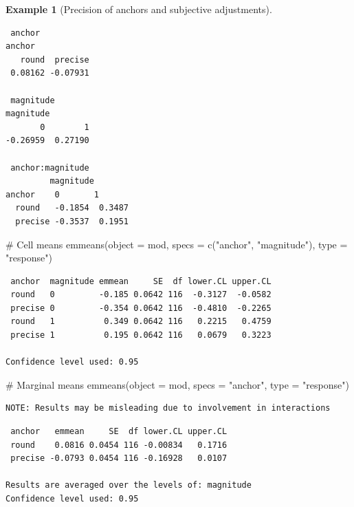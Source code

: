 \documentclass[
  11pt,
  letterpaper,
]{scrbook}
\newenvironment{Shaded}{\begin{snugshade}}{\end{snugshade}}
\newcommand{\AttributeTok}[1]{\textcolor[rgb]{0.40,0.45,0.13}{#1}}
\newcommand{\CommentTok}[1]{\textcolor[rgb]{0.37,0.37,0.37}{#1}}
\newcommand{\FunctionTok}[1]{\textcolor[rgb]{0.28,0.35,0.67}{#1}}
\newcommand{\NormalTok}[1]{\textcolor[rgb]{0.00,0.23,0.31}{#1}}
\newcommand{\StringTok}[1]{\textcolor[rgb]{0.13,0.47,0.30}{#1}}
\theoremstyle{definition}
\newtheorem{example}{Example}[chapter]
\theoremstyle{definition}
\theoremstyle{remark}
\begin{document}
\begin{example}[Precision of anchors and subjective
adjustments]
\begin{verbatim}
 anchor 
anchor
   round  precise 
 0.08162 -0.07931 

 magnitude 
magnitude
       0        1 
-0.26959  0.27190 

 anchor:magnitude 
         magnitude
anchor    0       1      
  round   -0.1854  0.3487
  precise -0.3537  0.1951
\end{verbatim}

\begin{Shaded}
\begin{Highlighting}[]
\CommentTok{\# Cell means}
\FunctionTok{emmeans}\NormalTok{(}\AttributeTok{object =}\NormalTok{ mod, }
        \AttributeTok{specs =} \FunctionTok{c}\NormalTok{(}\StringTok{"anchor"}\NormalTok{, }\StringTok{"magnitude"}\NormalTok{),}
        \AttributeTok{type =} \StringTok{"response"}\NormalTok{)}
\end{Highlighting}
\end{Shaded}

\begin{verbatim}
 anchor  magnitude emmean     SE  df lower.CL upper.CL
 round   0         -0.185 0.0642 116  -0.3127  -0.0582
 precise 0         -0.354 0.0642 116  -0.4810  -0.2265
 round   1          0.349 0.0642 116   0.2215   0.4759
 precise 1          0.195 0.0642 116   0.0679   0.3223

Confidence level used: 0.95 
\end{verbatim}

\begin{Shaded}
\begin{Highlighting}[]
\CommentTok{\# Marginal means}
\FunctionTok{emmeans}\NormalTok{(}\AttributeTok{object =}\NormalTok{ mod, }
        \AttributeTok{specs =} \StringTok{"anchor"}\NormalTok{, }
        \AttributeTok{type =} \StringTok{"response"}\NormalTok{)}
\end{Highlighting}
\end{Shaded}

\begin{verbatim}
NOTE: Results may be misleading due to involvement in interactions
\end{verbatim}

\begin{verbatim}
 anchor   emmean     SE  df lower.CL upper.CL
 round    0.0816 0.0454 116 -0.00834   0.1716
 precise -0.0793 0.0454 116 -0.16928   0.0107

Results are averaged over the levels of: magnitude 
Confidence level used: 0.95 
\end{verbatim}


\end{example}
\end{document}

